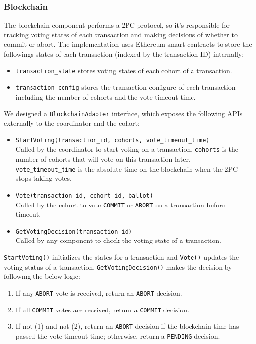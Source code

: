 \documentclass[11pt,conference]{IEEEtran}
\begin{document}
\subsubsection{Blockchain} \label{blockchain}

The blockchain component performs a 2PC protocol, so it’s responsible for tracking voting states of each transaction and making decisions of whether to commit or abort. The implementation uses Ethereum smart contracts to store the followings states of each transaction (indexed by the transaction ID) internally:

\begin{itemize}
  \item \texttt{transaction\_state} stores voting states of each cohort of a transaction.
  \item \texttt{transaction\_config} stores the transaction configure of each transaction including the number of cohorts and the vote timeout time.
\end{itemize}

We designed a \texttt{BlockchainAdapter} interface, which exposes the following APIs externally to the coordinator and the cohort:
\begin{itemize}
  \item \texttt{StartVoting(transaction\_id, cohorts, vote\_timeout\_time)}\\Called by the coordinator to start voting on a transaction. \texttt{cohorts} is the number of cohorts that will vote on this transaction later. \texttt{vote\_timeout\_time} is the absolute time on the blockchain when the 2PC stops taking votes.
  \item \texttt{Vote(transaction\_id, cohort\_id, ballot)}\\Called by the cohort to vote \texttt{COMMIT} or \texttt{ABORT} on a transaction before timeout.
  \item \texttt{GetVotingDecision(transaction\_id)}\\Called by any component to check the voting state of a transaction.
\end{itemize}

\texttt{StartVoting()} initializes the states for a transaction and \texttt{Vote()} updates the voting status of a transaction. \texttt{GetVotingDecision()} makes the decision by following the below logic:
\begin{enumerate}
  \item If any \texttt{ABORT} vote is received, return an \texttt{ABORT} decision.
  \item If all \texttt{COMMIT} votes are received, return a \texttt{COMMIT} decision.
  \item If not (1) and not (2), return an \texttt{ABORT} decision if the blockchain time has passed the vote timeout time; otherwise, return a \texttt{PENDING} decision.
\end{enumerate}
\end{document}
